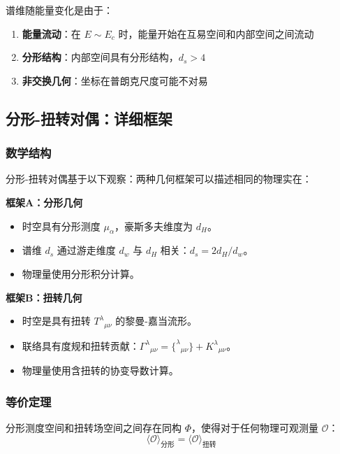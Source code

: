 \documentclass[12pt,a4paper]{article}
\begin{document}
谱维随能量变化是由于：
\begin{enumerate}
    \item \textbf{能量流动}：在 $E \sim E_c$ 时，能量开始在互易空间和内部空间之间流动
    \item \textbf{分形结构}：内部空间具有分形结构，$d_s > 4$
    \item \textbf{非交换几何}：坐标在普朗克尺度可能不对易
\end{enumerate}

\subsection{分形-扭转对偶：详细框架}

\subsubsection{数学结构}

分形-扭转对偶基于以下观察：两种几何框架可以描述相同的物理实在：

\textbf{框架A：分形几何}
\begin{itemize}
    \item 时空具有分形测度 $\mu_\alpha$，豪斯多夫维度为 $d_H$。
    \item 谱维 $d_s$ 通过游走维度 $d_w$ 与 $d_H$ 相关：$d_s = 2d_H/d_w$。
    \item 物理量使用分形积分计算。
\end{itemize}

\textbf{框架B：扭转几何}
\begin{itemize}
    \item 时空是具有扭转 $T^\lambda{}_{\mu\nu}$ 的黎曼-嘉当流形。
    \item 联络具有度规和扭转贡献：$\Gamma^\lambda{}_{\mu\nu} = \{^\lambda{}_{\mu\nu}\} + K^\lambda{}_{\mu\nu}$。
    \item 物理量使用含扭转的协变导数计算。
\end{itemize}

\subsubsection{等价定理}

\begin{theorem}[分形-扭转等价]
分形测度空间和扭转场空间之间存在同构 $\Phi$，使得对于任何物理可观测量 $\mathcal{O}$：
\begin{equation}
    \langle\mathcal{O}\rangle_{分形} = \langle\mathcal{O}\rangle_{扭转}
\end{equation}
\end{theorem}
\end{document}
